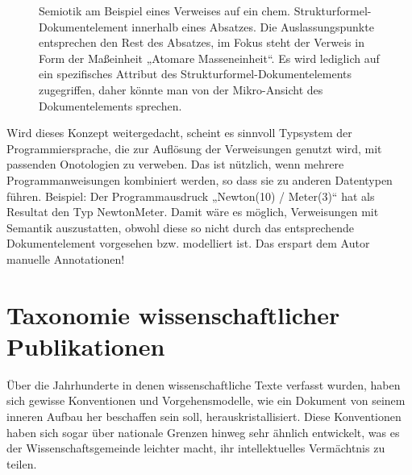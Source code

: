  
\begin{figure}[h!]
\centering
{}
\caption[Semiotik der Mikro-Ansicht eines Dokumentelements]{ Semiotik am Beispiel eines Verweises auf ein chem. Strukturformel-Dokumentelement innerhalb eines Absatzes. Die Auslassungspunkte entsprechen den Rest des Absatzes, im Fokus steht der Verweis in Form der Maßeinheit „Atomare Masseneinheit“. Es wird lediglich auf ein spezifisches Attribut des Strukturformel-Dokumentelements zugegriffen, daher könnte man von der Mikro-Ansicht des Dokumentelements sprechen. }\label{semiotikmikro}
\end{figure}
 
Wird dieses Konzept weitergedacht, scheint es sinnvoll Typsystem der Programmiersprache, die zur Auflösung der Verweisungen genutzt wird, mit passenden Onotologien zu verweben. Das ist nützlich, wenn mehrere Programmanweisungen kombiniert werden, so dass sie zu anderen Datentypen führen. Beispiel: Der Programmausdruck „Newton(10) / Meter(3)“ hat als Resultat den Typ NewtonMeter. Damit wäre es möglich, Verweisungen mit Semantik auszustatten, obwohl diese so nicht durch das entsprechende Dokumentelement vorgesehen bzw. modelliert ist. Das erspart dem Autor manuelle Annotationen!

 
\section{Taxonomie wissenschaftlicher Publikationen}\label{taxonomie-sec}
 
Über die Jahrhunderte in denen wissenschaftliche Texte verfasst wurden, haben sich gewisse Konventionen und Vorgehensmodelle, wie ein Dokument von seinem inneren Aufbau her beschaffen sein soll, herauskristallisiert. Diese Konventionen haben sich sogar über nationale Grenzen hinweg sehr ähnlich entwickelt, was es der Wissenschaftsgemeinde leichter macht, ihr intellektuelles Vermächtnis zu teilen.

